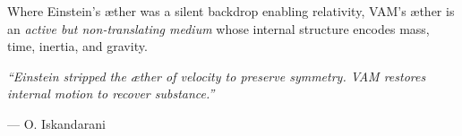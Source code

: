 \begin{tcolorbox}[
    title={Conclusion: From Silent Substrate to Structured Swirl},
    colback=gray!8!white,
    colframe=black,
    boxrule=0.6pt,
    sharp corners=southwest,
    fonttitle=\bfseries,
    breakable
]
Where Einstein’s æther was a silent backdrop enabling relativity, VAM’s æther is an \emph{active but non-translating medium} whose internal structure encodes mass, time, inertia, and gravity.
\vspace{0.5em}

\textit{“Einstein stripped the æther of velocity to preserve symmetry. VAM restores internal motion to recover substance.”}
\begin{flushright}
— O. Iskandarani
\end{flushright}
\end{tcolorbox}
